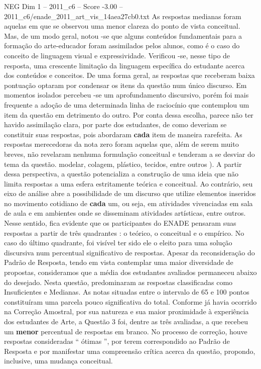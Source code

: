 \begin{textsample}{NEG Dim 1 – 2011\_c6 – Score -3.00 – 2011\_c6/enade\_2011\_art\_vis\_14aea27cb0.txt}
As respostas medianas foram aquelas em que se observou uma menor clareza do ponto de vista conceitual.
Mas, de um modo geral, notou -se que alguns conteúdos fundamentais para a formação do arte-educador foram assimilados pelos alunos, como é o caso do conceito de linguagem visual e expressividade.
Verificou -se, nesse tipo de resposta, uma crescente limitação da linguagem específica do estudante acerca dos conteúdos e conceitos.
De uma forma geral, as respostas que receberam baixa pontuação optaram por condensar os itens da questão num único discurso.
Em momentos isolados percebeu -se um aprofundamento discursivo, porém foi mais frequente a adoção de uma determinada linha de raciocínio que contemplou um item da questão em detrimento do outro.
Por conta dessa escolha, parece não ter havido assimilação clara, por parte dos estudantes, de como deveriam se constituir suas respostas, pois abordaram \textbf{cada} item de maneira rarefeita.
As respostas merecedoras da nota zero foram aquelas que, além de serem muito breves, não revelaram nenhuma formulação conceitual e tenderam a se desviar do tema da questão. modelar, colagem, plástico, tecidos, entre outros ).
A partir dessa perspectiva, a questão potencializa a construção de uma ideia que não limita respostas a uma esfera estritamente teórica e conceitual.
Ao contrário, seu eixo de análise abre a possibilidade de um discurso que utilize elementos inseridos no movimento cotidiano de \textbf{cada} um, ou seja, em atividades vivenciadas em sala de aula e em ambientes onde se disseminam atividades artísticas, entre outros.
Nesse sentido, fica evidente que os participantes do ENADE pensaram suas respostas a partir de três quadrantes : o teórico, o conceitual e o empírico.
No caso do último quadrante, foi visível ter sido ele o eleito para uma solução discursiva num percentual significativo de respostas.
Apesar da reconsideração do Padrão de Resposta, tendo em vista contemplar uma maior diversidade de propostas, consideramos que a média dos estudantes avaliados permaneceu abaixo do desejado.
Nesta questão, predominaram as respostas classificadas como Insuficientes e Medianas.
As notas situadas entre o intervalo de 65 e 100 pontos constituíram uma parcela pouco significativa do total.
Conforme já havia ocorrido na Correção Amostral, por sua natureza e sua maior proximidade à experiência dos estudantes de Arte, a Questão 3 foi, dentre as três avaliadas, a que recebeu um \textbf{menor} percentual de respostas em branco.
No processo de correção, houve respostas consideradas “ ótimas ”, por terem correspondido ao Padrão de Resposta e por manifestar uma compreensão crítica acerca da questão, propondo, inclusive, uma mudança conceitual.

\end{textsample}
